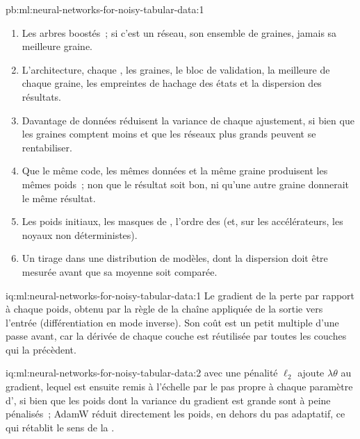 \begin{solution}{pb:ml:neural-networks-for-noisy-tabular-data:1}
\begin{enumerate}
distinguer cet écart à deux erreurs types demande 14 graines par architecture, et un ensemble de dix graines (0.066) bat
les exécutions isolées des deux architectures.
\item Les arbres boostés~; si c'est un réseau, son ensemble de graines, jamais sa meilleure graine.
\item L'architecture, chaque , les graines, le bloc de validation, la meilleure  de chaque graine, les empreintes de
hachage des états et la dispersion des résultats.
\item Davantage de données réduisent la variance de chaque ajustement, si bien que les graines comptent moins et que les réseaux plus grands peuvent se rentabiliser.
\item Que le même code, les mêmes données et la même graine produisent les mêmes poids~; non que le résultat soit bon, ni qu'une autre graine
donnerait le même résultat.
\item Les poids initiaux, les masques de , l'ordre des  (et, sur les accélérateurs, les
noyaux non déterministes).
\item Un tirage dans une distribution de modèles, dont la dispersion doit être mesurée avant que sa moyenne soit comparée.
\end{enumerate}
\end{solution}

\begin{solution}{iq:ml:neural-networks-for-noisy-tabular-data:1}
Le gradient de la perte par rapport à chaque poids, obtenu par la règle de la chaîne appliquée de la sortie vers l'entrée
(différentiation en mode inverse). Son coût est un petit multiple d'une passe avant, car la dérivée de chaque couche est réutilisée par toutes les
couches qui la précèdent.
\end{solution}

\begin{solution}{iq:ml:neural-networks-for-noisy-tabular-data:2}
 avec une pénalité $\ell_2$ ajoute $\lambda\theta$ au gradient, lequel est ensuite remis à l'échelle par le pas propre à chaque paramètre d', si bien que
les poids dont la variance du gradient est grande sont à peine pénalisés~; AdamW réduit directement les poids, en dehors du pas adaptatif,
ce qui rétablit le sens de la .
\end{solution}

